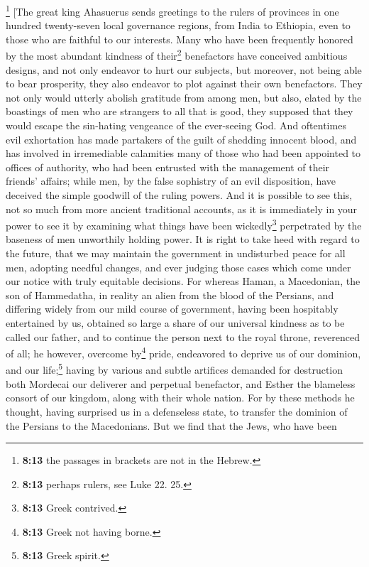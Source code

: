 \footnote{\textbf{8:13} the passages in brackets are not in the Hebrew.}
{[}The great king Ahasuerus sends greetings to the rulers of provinces
in one hundred twenty-seven local governance regions, from India to
Ethiopia, even to those who are faithful to our interests. Many who have
been frequently honored by the most abundant kindness of
their\footnote{\textbf{8:13} perhaps rulers, see Luke 22. 25.}
benefactors have conceived ambitious designs, and not only endeavor to
hurt our subjects, but moreover, not being able to bear prosperity, they
also endeavor to plot against their own benefactors. They not only would
utterly abolish gratitude from among men, but also, elated by the
boastings of men who are strangers to all that is good, they supposed
that they would escape the sin-hating vengeance of the ever-seeing God.
And oftentimes evil exhortation has made partakers of the guilt of
shedding innocent blood, and has involved in irremediable calamities
many of those who had been appointed to offices of authority, who had
been entrusted with the management of their friends' affairs; while men,
by the false sophistry of an evil disposition, have deceived the simple
goodwill of the ruling powers. And it is possible to see this, not so
much from more ancient traditional accounts, as it is immediately in
your power to see it by examining what things have been
wickedly\footnote{\textbf{8:13} Greek contrived.} perpetrated by the
baseness of men unworthily holding power. It is right to take heed with
regard to the future, that we may maintain the government in undisturbed
peace for all men, adopting needful changes, and ever judging those
cases which come under our notice with truly equitable decisions. For
whereas Haman, a Macedonian, the son of Hammedatha, in reality an alien
from the blood of the Persians, and differing widely from our mild
course of government, having been hospitably entertained by us, obtained
so large a share of our universal kindness as to be called our father,
and to continue the person next to the royal throne, reverenced of all;
he however, overcome by\footnote{\textbf{8:13} Greek not having borne.}
pride, endeavored to deprive us of our dominion, and our
life;\footnote{\textbf{8:13} Greek spirit.} having by various and subtle
artifices demanded for destruction both Mordecai our deliverer and
perpetual benefactor, and Esther the blameless consort of our kingdom,
along with their whole nation. For by these methods he thought, having
surprised us in a defenseless state, to transfer the dominion of the
Persians to the Macedonians. But we find that the Jews, who have been
